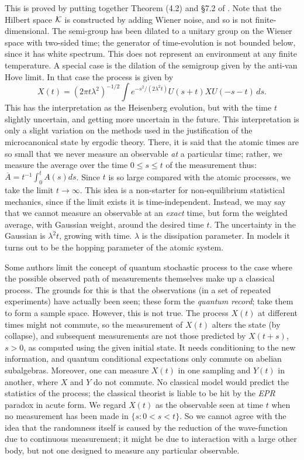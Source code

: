 This is proved by putting together Theorem (4.2) and \S 7.2 of \cite{Davies}.
Note that the Hilbert space ${\cal K}$ is constructed by adding Wiener
noise, and so is not finite-dimensional. The semi-group has been
dilated to a unitary group on the Wiener space with two-sided time;
the generator of time-evolution is not bounded below, since it has white
spectrum. This does not represent an environment at any finite temperature.
A special case is the dilation of the semigroup given by the anti-van Hove
limit. In that case the process is given by
\begin{equation}
X(t)=(2\pi t\lambda^2)^{-1/2}\int e^{-s^2/(2\lambda^2t)}U(s+t)XU(-s-t)\,ds.
\end{equation}
This has the interpretation as the Heisenberg evolution, but with the time
$t$ slightly uncertain, and getting more uncertain in the future.
This interpretation is only a slight
variation on the methods used in the justification of the microcanonical
state by ergodic theory. There, it is said that the atomic times are so
small that we never measure an observable {\em at} a particular time;
rather, we measure the average over the time $0\leq s\leq t$
of the measurement thus: $\overline{A}=t^{-1}\int_0^t A(s)ds$. Since
$t$ is so large compared with the atomic processes, we take the limit
$t\rightarrow\infty$. This idea is a non-starter for non-equilibrium
statistical mechanics, since if the limit exists it is time-independent.
Instead, we may say that we cannot measure an observable at an {\em exact}
time, but form the weighted average, with Gaussian weight, around
the desired time $t$. The uncertainty in the Gaussian is $\lambda^2 t$,
growing with time. $\lambda$ is the dissipation parameter. In models it
turns out to be the hopping parameter of the atomic system.

Some authors limit the concept of quantum stochastic process to
the case where the possible observed path of measurements themselves
make up a classical process. The grounds for this is that the observations
(in a set of repeated experiments) have actually been seen; these form
the {\em quantum record}; take them to
form a sample space. However, this is not true. The process $X(t)$
at different times might not
commute, so the measurement of $X(t)$ alters the state (by collapse),
and subsequent measurements are not those predicted by $X(t+s)$, $s>0$,
as computed using the given initial state. It needs conditioning
to the new information, and quantum conditional expectations only
commute on abelian subalgebras.
Moreover, one can measure $X(t)$ in one sampling and $Y(t)$ in another,
where $X$ and $Y$ do not commute. No classical model would predict
the statistics of the process; the classical theorist is liable to be hit
by the {\em EPR} paradox in acute form. We regard $X(t)$ as the observable
seen at time $t$ when no measurement has been made in $\{s:0<s<t\}$. So we
cannot agree with the idea that the randomness itself is caused by the
reduction of the wave-function due to continuous measurement; it might
be due to interaction with a large other body, but not one designed to
measure any particular observable.

